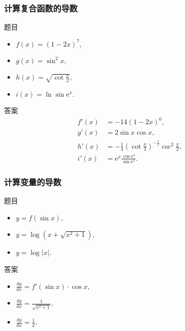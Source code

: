 \documentclass[
10pt,
aspectratio=43,
]{beamer}
\begin{document}
\begin{frame}
	\frametitle{计算复合函数的导数}
	\begin{block}{题目}
		\begin{itemize}
			\item $f(x)=(1-2 x)^7,$
			\item $g(x)=\sin ^2 x,$
			\item $h(x)=\sqrt{\cot \frac{x}{2}},$
			\item $i(x)=\ln \sin \mathrm{e}^x.$
		\end{itemize}
	\end{block}

	\pause

	\begin{exampleblock}{答案}
		\begin{align*}
			f'(x) & = -14(1-2x)^6,                                             \\
			g'(x) & = 2\sin x \cos x,                                          \\
			h'(x) & = -\frac{1}{4}\left(\cot \frac{x}{2}\right)^{-\frac12} \csc^2 \frac{x}{2},  \\
			i'(x) & = \mathrm{e}^x\frac{\cos \mathrm{e}^x}{\sin \mathrm{e}^x}.
		\end{align*}
	\end{exampleblock}

\end{frame}

\begin{frame}
	\frametitle{计算变量的导数}

	\begin{block}{题目}
		\begin{itemize}
  			\item $y = f(\sin x)$,
			\item $y = \log \left(x+\sqrt{x^2+1}\right)$,
			\item $y = \log |x|$.
		\end{itemize}
	\end{block}

	\pause

	\begin{exampleblock}{答案}
		{\small
			\begin{itemize}
				\item   $\displaystyle\frac{dy}{dx} = f'(\sin x) \cdot \cos x,$
                \item   $\displaystyle\frac{dy}{dx} = \frac{1}{\sqrt{x^2+1}},$
				\item   $\displaystyle\frac{dy}{dx} = \frac{1}{x}.$
			\end{itemize}
		}
	\end{exampleblock}
\end{frame}
\end{document}

